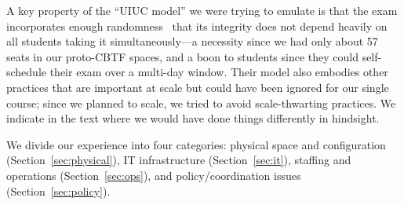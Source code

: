 A key property of the ``UIUC model'' we were trying to emulate
is that the exam incorporates enough randomness~\cite{chen-how-much-randomization} that its
integrity does not depend heavily on all
students taking it simultaneously---a necessity since we had only about
57 seats in our proto-CBTF spaces, and a boon to students since they could
self-schedule their exam over a multi-day window.
Their model also embodies other
practices that are important at scale but could  have been ignored for our single course;
since we planned to scale, we tried to avoid scale-thwarting
practices.  We indicate in the text
where we would have done things differently in hindsight.

We divide our experience into four categories: physical space and
configuration (Section~\ref{sec:physical}), IT infrastructure
(Section~\ref{sec:it}), staffing and operations
(Section~\ref{sec:ops}),
and policy/coordination issues (Section~\ref{sec:policy}).
